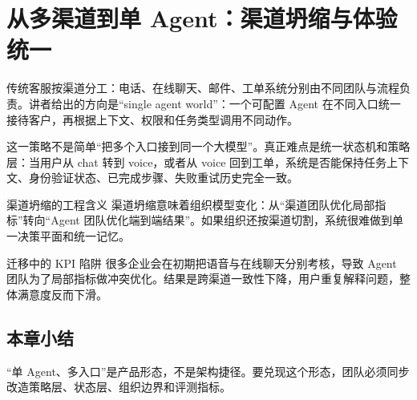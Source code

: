 \section{从多渠道到单 Agent：渠道坍缩与体验统一}

传统客服按渠道分工：电话、在线聊天、邮件、工单系统分别由不同团队与流程负责。讲者给出的方向是“single agent world”：一个可配置 Agent 在不同入口统一接待客户，再根据上下文、权限和任务类型调用不同动作。

这一策略不是简单“把多个入口接到同一个大模型”。真正难点是统一状态机和策略层：当用户从 chat 转到 voice，或者从 voice 回到工单，系统是否能保持任务上下文、身份验证状态、已完成步骤、失败重试历史完全一致。

\begin{importantbox}{渠道坍缩的工程含义}
渠道坍缩意味着组织模型变化：从“渠道团队优化局部指标”转向“Agent 团队优化端到端结果”。如果组织还按渠道切割，系统很难做到单一决策平面和统一记忆。
\end{importantbox}

\begin{warningbox}{迁移中的 KPI 陷阱}
很多企业会在初期把语音与在线聊天分别考核，导致 Agent 团队为了局部指标做冲突优化。结果是跨渠道一致性下降，用户重复解释问题，整体满意度反而下滑。
\end{warningbox}

\subsection{本章小结}

“单 Agent、多入口”是产品形态，不是架构捷径。要兑现这个形态，团队必须同步改造策略层、状态层、组织边界和评测指标。

